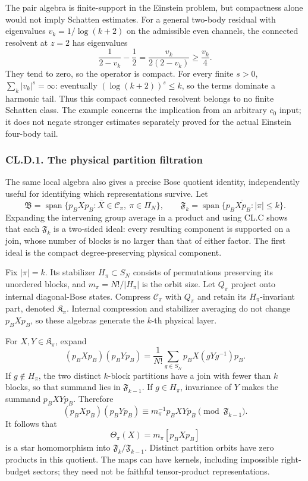 The pair algebra is finite-support in the Einstein problem, but compactness alone would not imply Schatten estimates. For a general two-body residual with eigenvalues \(v_k=1/\log(k+2)\) on the admissible even channels, the connected resolvent at \(z=2\) has eigenvalues \[
\frac1{2-v_k}-\frac12=\frac{v_k}{2(2-v_k)}\geq\frac{v_k}{4}.
\] They tend to zero, so the operator is compact. For every finite \(s>0\), \(\sum_k|v_k|^s=\infty\): eventually \((\log(k+2))^s\leq k\), so the terms dominate a harmonic tail. Thus this compact connected resolvent belongs to no finite Schatten class. The example concerns the implication from an arbitrary \(c_0\) input; it does not negate stronger estimates separately proved for the actual Einstein four-body tail.

\hypertarget{cl.d.1.-the-physical-partition-filtration}{%
\subsubsection{CL.D.1. The physical partition filtration}\label{cl.d.1.-the-physical-partition-filtration}}

The same local algebra also gives a precise Bose quotient identity, independently useful for identifying which representations survive. Let \[
\mathfrak B=\overline{\operatorname{span}\{p_BXp_B:X\in\mathcal C_\pi,\ \pi\in\Pi_N\}},
\qquad
\mathfrak F_k=\overline{\operatorname{span}\{p_BXp_B:|\pi|\leq k\}}.
\] Expanding the intervening group average in a product and using CL.C shows that each \(\mathfrak F_k\) is a two-sided ideal: every resulting component is supported on a join, whose number of blocks is no larger than that of either factor. The first ideal is the compact degree-preserving physical component.

Fix \(|\pi|=k\). Its stabilizer \(H_\pi\subset S_N\) consists of permutations preserving its unordered blocks, and \(m_\pi=N!/|H_\pi|\) is the orbit size. Let \(Q_\pi\) project onto internal diagonal-Bose states. Compress \(\mathcal C_\pi\) with \(Q_\pi\) and retain its \(H_\pi\)-invariant part, denoted \(\mathfrak K_\pi\). Internal compression and stabilizer averaging do not change \(p_BXp_B\), so these algebras generate the \(k\)-th physical layer.

For \(X,Y\in\mathfrak K_\pi\), expand \[
(p_BXp_B)(p_BYp_B)
=\frac1{N!}\sum_{g\in S_N}p_BX(gYg^{-1})p_B.
\] If \(g\notin H_\pi\), the two distinct \(k\)-block partitions have a join with fewer than \(k\) blocks, so that summand lies in \(\mathfrak F_{k-1}\). If \(g\in H_\pi\), invariance of \(Y\) makes the summand \(p_BXYp_B\). Therefore \[
(p_BXp_B)(p_BYp_B)
\equiv m_\pi^{-1}p_BXYp_B\pmod{\mathfrak F_{k-1}}.
\tag{CL.D5}
\] It follows that \[
\Theta_\pi(X)=m_\pi[p_BXp_B]
\] is a star homomorphism into \(\mathfrak F_k/\mathfrak F_{k-1}\). Distinct partition orbits have zero products in this quotient. The maps can have kernels, including impossible right-budget sectors; they need not be faithful tensor-product representations.

